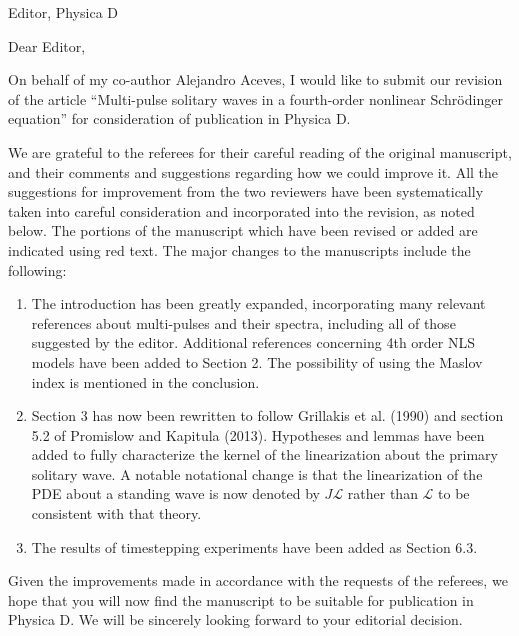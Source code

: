 \documentclass[11pt]{letter}
\begin{document}
\address{Ross Parker \\
Department of Mathematics \\
Southern Methodist University \\
Dallas, TX 75275 \\
\texttt{rhparker@smu.edu}}%
\signature{Ross Parker}
\begin{letter}{Editor, Physica D}

\opening{Dear Editor,}

On behalf of my co-author Alejandro Aceves, I would like to submit our revision of the article ``Multi-pulse solitary waves in a fourth-order nonlinear {S}chr{\"o}dinger equation'' for consideration of publication in Physica D. 

We are grateful to the referees for their careful reading of the original manuscript, and their comments and suggestions regarding how we could improve it. All the suggestions for improvement from the two reviewers have been systematically taken into careful consideration and incorporated into the revision, as noted below. The portions of the manuscript which have been revised or added are indicated using red text. The major changes to the manuscripts include the following:
\begin{enumerate}
	\item The introduction has been greatly expanded, incorporating many relevant references about multi-pulses and their spectra, including all of those suggested by the editor. Additional references concerning 4th order NLS models have been added to Section 2. The possibility of using the Maslov index is mentioned in the conclusion.
	\item Section 3 has now been rewritten to follow Grillakis et al. (1990) and section 5.2 of Promislow and Kapitula (2013). Hypotheses and lemmas have been added to fully characterize the kernel of the linearization about the primary solitary wave. A notable notational change is that the linearization of the PDE about a standing wave is now denoted by $J \mathcal{L}$ rather than $\mathcal{L}$ to be consistent with that theory.  
	\item The results of timestepping experiments have been added as Section 6.3.
\end{enumerate}

Given the improvements made in accordance with the requests of the referees, we hope that you will now find the manuscript to be suitable for publication in Physica D. We will be sincerely looking forward to your editorial decision.


\end{letter}
\end{document}
